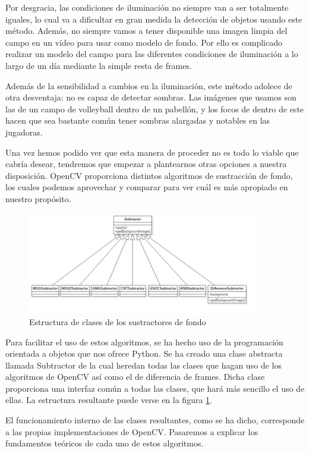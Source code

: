 Por desgracia, las condiciones de iluminación no siempre van a ser totalmente iguales, lo cual va a dificultar en gran medida la detección de objetos usando este método. Además, no siempre vamos a tener disponible una imagen limpia del campo en un vídeo para usar como modelo de fondo. Por ello es complicado realizar un modelo del campo para las diferentes condiciones de iluminación a lo largo de un día mediante la simple resta de frames.

Además de la sensibilidad a cambios en la iluminación, este método adolece de otra desventaja: no es capaz de detectar sombras. Las imágenes que usamos son las de un campo de volleyball dentro de un pabellón, y los focos de dentro de este hacen que sea bastante común tener sombras alargadas y notables en las jugadoras.

Una vez hemos podido ver que esta manera de proceder no es todo lo viable que cabría desear, tendremos que empezar a plantearnos otras opciones a nuestra disposición. OpenCV proporciona distintos algoritmos de sustracción de fondo, los cuales podemos aprovechar y comparar para ver cuál es más apropiado en nuestro propósito.

\begin{figure}
    \centering
    \includegraphics[width=0.9\textwidth]{images/subtractors}
    \caption{Estructura de clases de los sustractores de fondo}
    \label{fig:subtractors}
\end{figure}

Para facilitar el uso de estos algoritmos, se ha hecho uso de la programación orientada a objetos que nos ofrece Python. Se ha creado una clase abstracta llamada Subtractor de la cual heredan todas las clases que hagan uso de los algoritmos de OpenCV así como el de diferencia de frames. Dicha clase proporciona una interfaz común a todas las clases, que hará más sencillo el uso de ellas. La estructura resultante puede verse en la figura \ref{fig:subtractors}.

El funcionamiento interno de las clases resultantes, como se ha dicho, corresponde a las propias implementaciones de OpenCV. Pasaremos a explicar los fundamentos teóricos de cada uno de estos algoritmos.

